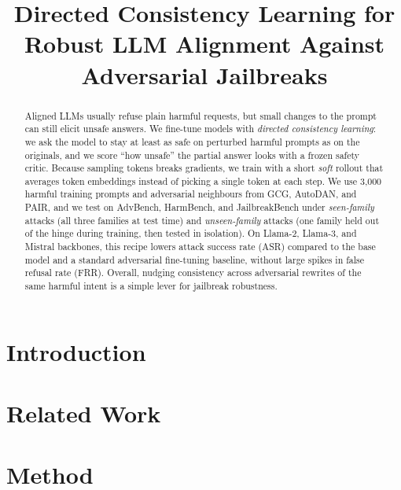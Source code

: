 \documentclass{article}
\title{Directed Consistency Learning for Robust LLM Alignment Against Adversarial Jailbreaks}
\author{%
}
\begin{document}
\maketitle

\begin{abstract}
Aligned LLMs usually refuse plain harmful requests, but small changes to the prompt can still elicit unsafe answers. We fine-tune models with \emph{directed consistency learning}: we ask the model to stay at least as safe on perturbed harmful prompts as on the originals, and we score ``how unsafe'' the partial answer looks with a frozen safety critic. Because sampling tokens breaks gradients, we train with a short \emph{soft} rollout that averages token embeddings instead of picking a single token at each step. We use 3{,}000 harmful training prompts and adversarial neighbours from GCG, AutoDAN, and PAIR, and we test on AdvBench, HarmBench, and JailbreakBench under \emph{seen-family} attacks (all three families at test time) and \emph{unseen-family} attacks (one family held out of the hinge during training, then tested in isolation). On Llama-2, Llama-3, and Mistral backbones, this recipe lowers attack success rate (ASR) compared to the base model and a standard adversarial fine-tuning baseline, without large spikes in false refusal rate (FRR). Overall, nudging consistency across adversarial rewrites of the same harmful intent is a simple lever for jailbreak robustness.
\end{abstract}

\section{Introduction}



\section{Related Work}

\section{Method}
\label{sec:method}
\end{document}
